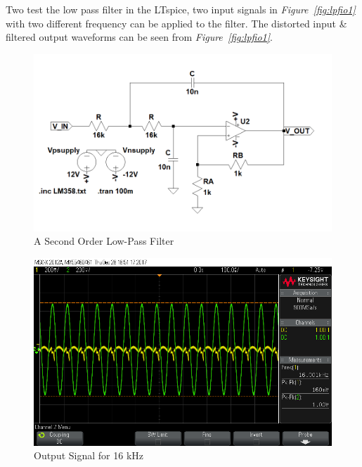 \documentclass[paper]{IEEEtran}
\begin{document}
	 Two test the low pass filter in the LTspice, two input signals in \textit{Figure~\ref{fig:lpfio1}} with two different frequency can be applied to the filter. The distorted input \& filtered output waveforms can be seen from \textit{Figure~\ref{fig:lpfio1}}.


\begin{figure}[h!]
	\setlength{\unitlength}{\textwidth}
	\center 
	\includegraphics[width=0.5\unitlength]{lpf_v2.png}
	\caption{\label{fig:lpf}A Second Order Low-Pass Filter }
\end{figure} 
	


\begin{figure}[h!]
	\setlength{\unitlength}{\textwidth}
	\center 
	\includegraphics[width=0.45\unitlength]{lpf_osc2.png}
	\caption{\label{fig:lpfvo1}Output Signal for 16 kHz}
\end{figure} 
	
\end{document}
